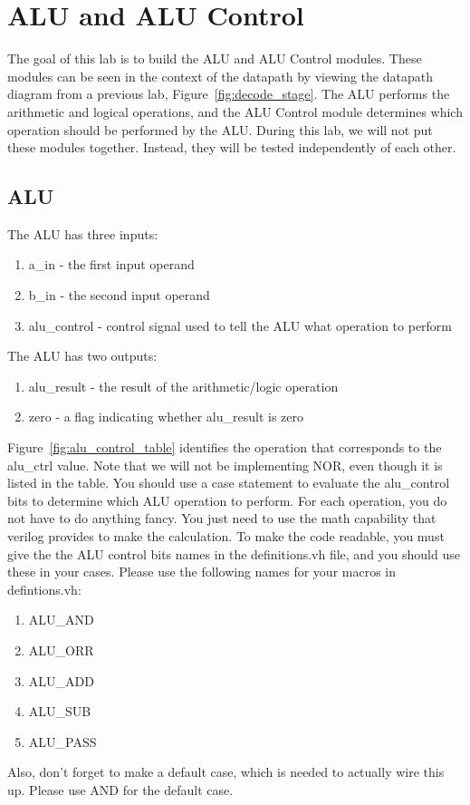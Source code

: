 \chapter{ALU and ALU Control}
The goal of this lab is to build the ALU and ALU Control modules. These modules can be seen in the context of the datapath by viewing the datapath diagram from a previous lab, Figure~\ref{fig:decode_stage}.  The ALU performs the arithmetic and logical operations, and the ALU Control module determines which operation should be performed by the ALU.  During this lab, we will not put these modules together.  Instead, they will be tested independently of each other.
\section{ALU}
The ALU has three inputs:
\begin{enumerate}
	\item a\_in - the first input operand
	\item b\_in - the second input operand
	\item alu\_control - control signal used to tell the ALU what operation to perform
\end{enumerate}
The ALU has two outputs:
\begin{enumerate}
	\item alu\_result - the result of the arithmetic/logic operation
	\item zero - a flag indicating whether alu\_result is zero
\end{enumerate}  
Figure~\ref{fig:alu_control_table} identifies the operation that corresponds to the alu\_ctrl value.  Note that we will not be implementing NOR, even though it is listed in the table.  You should use a case statement to evaluate the alu\_control bits to determine which ALU operation to perform.  For each operation, you do not have to do anything fancy.  You just need to use the math capability that verilog provides to make the calculation.  To make the code readable, you must give the the ALU control bits names in the definitions.vh file, and you should use these in your cases.  Please use the following names for your macros in defintions.vh:
\begin{enumerate}
	\item ALU\_AND
	\item ALU\_ORR
	\item ALU\_ADD
	\item ALU\_SUB
	\item ALU\_PASS
\end{enumerate}
Also, don't forget to make a default case, which is needed to actually wire this up.  Please use AND for the default case.

